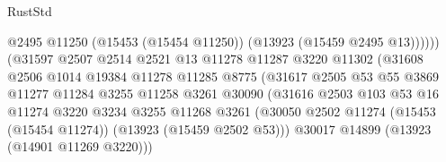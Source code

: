 \begin{lexlean}{RustStd}
\begin{coremodule}
                                              @2495
                                              @11250
                                              (@15453 (@15454 @11250))
                                              (@13923 (@15459 @2495 @13))))))
                                      (@31597
                                        @2507
                                        @2514
                                        @2521
                                        @13
                                        @11278
                                        @11287
                                        @3220
                                        @11302
                                        (@31608
                                          @2506
                                          @1014
                                          @19384
                                          @11278
                                          @11285
                                          @8775
                                          (@31617
                                            @2505
                                            @53
                                            @55
                                            @3869
                                            @11277
                                            @11284
                                            @3255
                                            @11258
                                            @3261
                                            @30090
                                            (@31616
                                              @2503
                                              @103
                                              @53
                                              @16
                                              @11274
                                              @3220
                                              @3234
                                              @3255
                                              @11268
                                              @3261
                                              (@30050
                                                @2502
                                                @11274
                                                (@15453 (@15454 @11274))
                                                (@13923 (@15459 @2502 @53)))
                                              @30017
                                              @14899
                                              (@13923 (@14901 @11269 @3220)))

\end{coremodule}
\end{lexlean}
